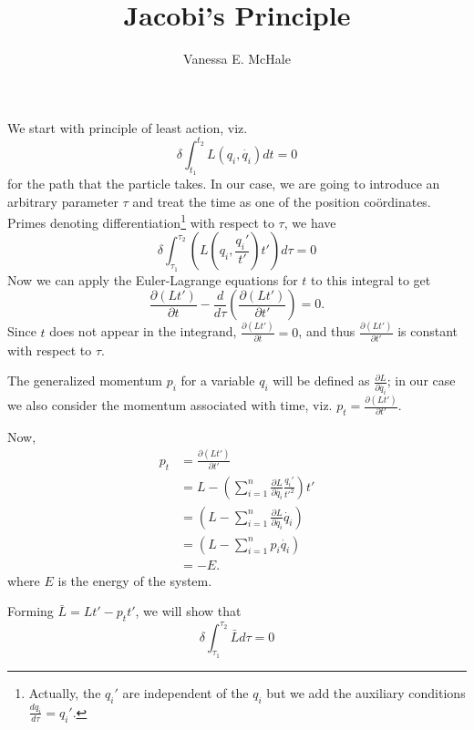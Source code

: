 \documentclass{article}
\begin{document}
\title{Jacobi's Principle}
\author{Vanessa E. McHale}
\date{}
\maketitle
We start with principle of least action, viz.
\begin{equation}
\delta\int_{t_1}^{t_2}L(q_i,\dot{q_i})dt=0
\end{equation}
for the path that the particle takes. In our case, we are going to introduce an arbitrary parameter $\tau$ and treat the time as one of the position co\"ordinates. Primes denoting differentiation\footnote{Actually, the $q_i'$ are independent of the $q_i$ but we add the auxiliary conditions $\frac{dq_i}{d\tau}=q_i'$.} with respect to $\tau$, we have
\begin{equation}
\delta\int_{\tau_1}^{\tau_2}\left(L\left(q_i,\frac{q_i'}{t'}\right)t'\right)d\tau=0
\end{equation}
Now we can apply the Euler-Lagrange equations for $t$ to this integral to get
\begin{equation}
\frac{\partial(Lt')}{\partial t}-\frac{d}{d\tau}\left(\frac{\partial(Lt')}{\partial t'}\right)=0.
\end{equation}
Since $t$ does not appear in the integrand, $\displaystyle\frac{\partial(Lt')}{\partial t}=0$, and thus $\displaystyle\frac{\partial(Lt')}{\partial t'}$ is constant with respect to $\tau$.

The generalized momentum $p_i$ for a variable $q_i$ will be defined as $\displaystyle\frac{\partial L}{\partial\dot{q_i}}$; in our case we also consider the momentum associated with time, viz. $\displaystyle p_t=\frac{\partial(Lt')}{\partial t'}.$

Now,
\begin{align*}
p_t&=\frac{\partial(Lt')}{\partial t'}\\
&=L-\left(\sum_{i=1}^n\frac{\partial L}{\partial\dot{q_i}}\frac{q_i'}{t'^2}\right)t'\\
&=\left(L-\sum_{i=1}^n\frac{\partial L}{\partial\dot{q_i}}\dot{q_i}\right)\\
&=\left(L-\sum_{i=1}^n p_i\dot{q_i}\right)\\
&=-E.
\end{align*}
where $E$ is the energy of the system.

Forming $\bar{L}=Lt'-p_tt'$, we will show that
\begin{equation}
\delta\int_{\tau_1}^{\tau_2}\bar{L}d\tau=0
\end{equation}
\end{document}
